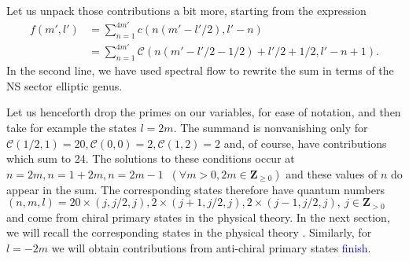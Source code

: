 \documentclass[11pt]{amsart}
\newcommand{\Z}{\mathbf Z}
\theoremstyle{thm}
\numberwithin{equation}{subsection}
\theoremstyle{def}
\theoremstyle{rem}
\begin{document}

Let us unpack those contributions a bit more, starting from the expression 
\begin{align*}\label{eq:fml1}
f(m', l') &= \sum_{n=1}^{4m'}c(n(m'-l'/2), l'-n) \\
&= \sum_{n=1}^{4m'}\mathcal{C}(n(m'-l'/2 - 1/2) + l'/2 + 1/2, l' - n +1).
\end{align*} In the second line, we have used spectral flow to rewrite the sum in terms of the NS sector elliptic genus.


Let us henceforth drop the primes on our variables, for ease of notation, and then take for example the states $l = 2 m$. The summand is nonvanishing only for $\mathcal{C}(1/2, 1)= 20, \mathcal{C}(0, 0)=2, \mathcal{C}(1, 2)= 2$ and, of course, have contributions which sum to 24. The solutions to these conditions occur at $n=2m, n = 1 + 2m, n=2m -1$ $ \ (\forall m >0, 2m \in \Z_{\geq 0})$ and these values of $n$ do appear in the sum. The corresponding states therefore have quantum numbers $(n, m, l) = 20\times(j, j/2, j), 2\times(j + 1, j/2, j), 2\times(j-1, j/2, j), \ j \in \Z_{>0}$ and come from chiral primary states in the physical theory. In the next section, we will recall the corresponding states in the physical theory \cite{luninmathur, others...}. Similarly, for $l = -2m$ we will obtain contributions from anti-chiral primary states \textcolor{blue}{finish}. 
\end{document}

